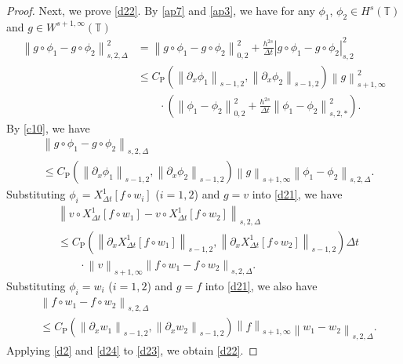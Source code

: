 \documentclass[10pt,a4paper,tbtags,leqno]{amsart}
\theoremstyle{definition}
\numberwithin{equation}{section}
\def\norm#1#2{\left\|#2\right\|_{#1}}
\def\snorm#1#2{\left|#2\right|_{#1}}
\begin{document}
\begin{proof}
  Next, we prove \eqref{d22}. By \eqref{ap7} and \eqref{ap3}, we have for any $ \phi_1 $, $ \phi_2 \in H^s (\mathbb{T}) $ and $ g \in W^{s + 1, \infty} (\mathbb{T}) $ 
  \begin{align} 
    \norm{s, 2, \Delta}{g \circ \phi_1 - g \circ \phi_2}^2 & = \norm{0, 2}{g \circ \phi_1 - g \circ \phi_2}^2 + \frac{h^{2s}}{\Delta t} \snorm{s, 2}{g \circ \phi_1 - g \circ \phi_2}^2 \\ & \leq C_{\mathrm{P}} (\norm{s - 1, 2}{\partial_x \phi_1}, \norm{s - 1, 2}{\partial_x \phi_2}) \norm{s + 1, \infty}{g}^2 \\ & \qquad \cdot \left( \norm{0, 2}{\phi_1 - \phi_2}^2 + \frac{h^{2s}}{\Delta t} \norm{s, 2, \ast}{\phi_1 - \phi_2}^2 \right). 
  \end{align} 
  By \eqref{c10}, we have 
  \begin{align} 
    & \norm{s, 2, \Delta}{g \circ \phi_1 - g \circ \phi_2} \\ & \leq C_{\mathrm{P}} (\norm{s - 1, 2}{\partial_x \phi_1}, \norm{s - 1, 2}{\partial_x \phi_2}) \norm{s + 1, \infty}{g} \norm{s, 2, \Delta}{\phi_1 - \phi_2}. \label{d21} 
  \end{align} 
  Substituting $ \phi_i = {X_{\Delta t}^1} [f \circ w_i] $ ($ i = 1, 2 $) and $ g = v $ into \eqref{d21}, we have 
  \begin{align} 
    & \norm{s, 2, \Delta}{v \circ {X_{\Delta t}^1} [f \circ w_1] - v \circ {X_{\Delta t}^1} [f \circ w_2]} \\ 
    & \leq C_{\mathrm{P}} (\norm{s - 1, 2}{\partial_x {X_{\Delta t}^1} [f \circ w_1]}, \norm{s - 1, 2}{\partial_x {X_{\Delta t}^1} [f \circ w_2]}) \Delta t \\ & \qquad \cdot \norm{s + 1, \infty}{v} \norm{s, 2, \Delta}{f \circ w_1 - f \circ w_2}. \label{d23} 
  \end{align} 
  Substituting $ \phi_i = w_i $ ($ i = 1, 2 $) and $ g = f $ into \eqref{d21}, we also have 
  \begin{align} 
    & \norm{s, 2, \Delta}{f \circ w_1 - f \circ w_2} \\ & \leq C_{\mathrm{P}} (\norm{s - 1, 2}{\partial_x w_1}, \norm{s - 1, 2}{\partial_x w_2}) \norm{s + 1, \infty}{f} \norm{s, 2, \Delta}{w_1 - w_2}. \label{d24} 
  \end{align} 
   Applying \eqref{d2} and \eqref{d24} to \eqref{d23}, we obtain \eqref{d22}. 
\end{proof} 



%  
%  
\end{document}
